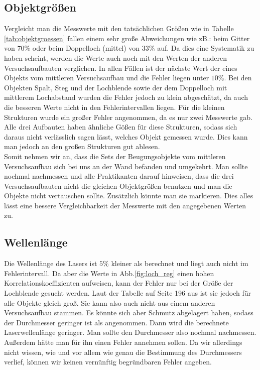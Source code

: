 \documentclass[12pt,a4paper,titlepage,headinclude,bibtotoc]{scrartcl}
\begin{document}
\subsection{Objektgrößen}
Vergleicht man die Messwerte mit den tatsächlichen Größen wie in Tabelle \ref{tab:objektgroessen} fallen einem sehr große Abweichungen wie zB.: beim Gitter von $70\%$ oder beim Doppelloch (mittel) von $33\%$ auf.
Da dies eine Systematik zu haben scheint, werden die Werte auch noch mit den Werten der anderen Versuchsaufbauten verglichen.
In allen Fällen ist der nächste Wert der eines Objekts vom mittleren Versuchsaufbau und die Fehler liegen unter $10\%$.
Bei den Objekten Spalt, Steg und der Lochblende sowie der dem Doppelloch mit mittlerem Lochabstand wurden die Fehler jedoch zu klein abgeschätzt, da auch die besseren Werte nicht in den Fehlerintervallen liegen.
Für die kleinen Strukturen wurde ein großer Fehler angenommen, da es nur zwei Messwerte gab.
Alle drei Aufbauten haben ähnliche Gößen für diese Strukturen, sodass sich daraus nicht verlässlich sagen lässt, welches Objekt gemessen wurde.
Dies kann man jedoch an den großen Strukturen gut ablesen.\\

Somit nehmen wir an, dass die Sets der Beugungsobjekte vom mittleren Versuchsaufbau sich bei uns an der Wand befanden und umgekehrt.
Man sollte nochmal nachmessen und alle Praktikanten darauf hinweisen, dass die drei Versuchsaufbauten nicht die gleichen Objektgrößen benutzen und man die Objekte nicht vertauschen sollte.
Zusätzlich könnte man sie markieren.
Dies alles lässt eine bessere Vergleichbarkeit der Messwerte mit den angegebenen Werten zu.

\subsection{Wellenlänge}
Die Wellenlänge des Lasers ist $5\%$ kleiner als berechnet und liegt auch nicht im Fehlerintervall.
Da aber die Werte in Abb.\ref{fig:loch_reg} einen hohen Korrelationskoeffizienten aufweisen, kann der Fehler nur bei der Größe der Lochblende gesucht werden.
Laut der Tabelle auf Seite 196 aus \cite{prakti} ist sie jedoch für alle Objekte gleich groß.
Sie kann also auch nicht aus einem anderen Versuchsaufbau stammen.
Es könnte sich aber Schmutz abgelagert haben, sodass der Durchmesser geringer ist als angenommen.
Dann wird die berechnete Laserwellenlänge geringer.
Man sollte den Durchmesser also nochmal nachmessen.
Außerdem hätte man für ihn einen Fehler annehmen sollen.
Da wir allerdings nicht wissen, wie und vor allem wie genau die Bestimmung des Durchmessers verlief, können wir keinen vernünftig begründbaren Fehler angeben.
\end{document}

